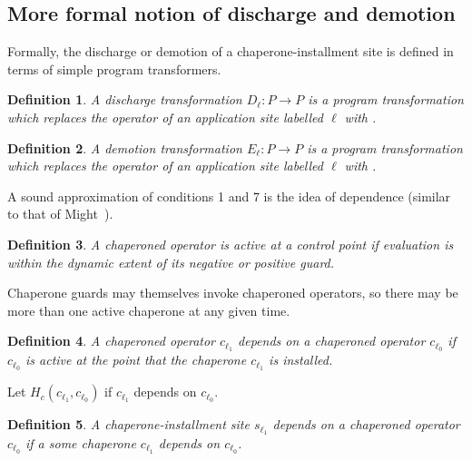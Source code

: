 \documentclass{sigplanconf}
\newtheorem{definition}{Definition}
\begin{document}


\subsection{More formal notion of discharge and demotion}

Formally, the discharge or demotion of a chaperone-installment site is defined in terms of simple program transformers.

\begin{definition}
A \emph{discharge transformation} $D_\ell : P\rightarrow P$ is a program transformation which replaces the operator of an application site labelled $\ell$ with .
\end{definition}

\begin{definition}
A \emph{demotion transformation} $E_\ell : P\rightarrow P$ is a program transformation which replaces the operator of an application site labelled $\ell$ with .
\end{definition}

A sound approximation of conditions 1 and 7 is the idea of dependence (similar to that of Might~\cite{might2009interprocedural}).

\begin{definition}
A chaperoned operator is \emph{active} at a control point if evaluation is within the dynamic extent of its negative or positive guard.
\end{definition}

Chaperone guards may themselves invoke chaperoned operators, so there may be more than one active chaperone at any given time.

\begin{definition}
A chaperoned operator $c_{\ell_1}$ \emph{depends} on a chaperoned operator $c_{\ell_0}$ if $c_{\ell_0}$ is active at the point that the chaperone $c_{\ell_1}$ is installed.
\end{definition}

Let $H_c(c_{\ell_1},c_{\ell_0})$ if $c_{\ell_1}$ depends on $c_{\ell_0}$.

\begin{definition}
A chaperone-installment site $s_{\ell_1}$ \emph{depends} on a chaperoned operator $c_{\ell_0}$ if a some chaperone $c_{\ell_1}$ depends on $c_{\ell_0}$.
\end{definition}
\end{document}
